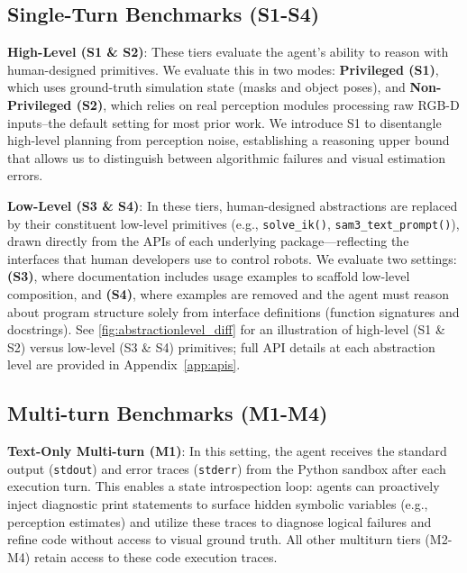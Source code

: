 \subsection{Single-Turn Benchmarks (S1-S4)}
\label{subsec:singleturn}

\textbf{High-Level (S1 \& S2)}: These tiers evaluate the agent's ability to reason with human-designed primitives. We evaluate this in two modes: \textbf{Privileged (S1)}, which uses ground-truth simulation state (masks and object poses), and \textbf{Non-Privileged (S2)}, which relies on real perception modules processing raw RGB-D inputs--the default setting for most prior work. We introduce S1 to disentangle high-level planning from perception noise, establishing a reasoning upper bound that allows us to distinguish between algorithmic failures and visual estimation errors.



\textbf{Low-Level (S3 \& S4)}: In these tiers, human-designed abstractions are replaced by their constituent low-level primitives (e.g., \texttt{solve\_ik()}, \texttt{sam3\_text\_prompt()}), drawn directly from the APIs of each underlying package—reflecting the interfaces that human developers use to control robots. We evaluate two settings: \textbf{(S3)}, where documentation includes usage examples to scaffold low-level composition, and \textbf{(S4)}, where examples are removed and the agent must reason about program structure solely from interface definitions (function signatures and docstrings). See \cref{fig:abstractionlevel_diff} for an illustration of high-level (S1 \& S2) versus low-level (S3 \& S4) primitives; full API details at each abstraction level are provided in Appendix~\ref{app:apis}.


\subsection{Multi-turn Benchmarks (M1-M4)} 

\textbf{Text-Only Multi-turn (M1)}: In this setting, the agent receives the standard output (\texttt{stdout}) and error traces (\texttt{stderr}) from the Python sandbox after each execution turn. This enables a state introspection loop: agents can proactively inject diagnostic print statements to surface hidden symbolic variables (e.g., perception estimates) and utilize these traces to diagnose logical failures and refine code without access to visual ground truth. All other multiturn tiers (M2-M4) retain access to these code execution traces.

